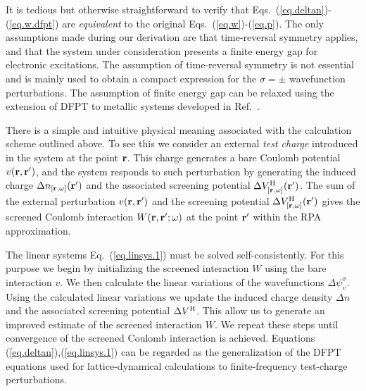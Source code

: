 \documentclass[twocolumn,prb,showpacs,superscriptaddress]{revtex4}
\def\s1{\hspace{0.5cm}}
\def\s2{\hspace{1cm}}
\def\w{\omega}
\def\s{\sigma}
\def\r{{\bf r}}
\def\rp{{\bf r^\prime}}
\begin{document}
It is tedious but otherwise straightforward to verify that 
Eqs.\ (\ref{eq.deltan})-(\ref{eq.w.dfpt}) are {\it equivalent} to the 
original Eqs.\ (\ref{eq.w})-(\ref{eq.p}).
The only assumptions made during our derivation are that 
time-reversal symmetry applies,
and that the system under consideration presents a finite 
energy gap for electronic excitations. 
The assumption of time-reversal symmetry is not essential and is mainly used to
obtain a compact expression for the $\sigma=\pm$ wavefunction perturbations.
The assumption of finite energy gap can be relaxed using the extension
of DFPT to metallic systems developed in Ref.\ . 


There is a simple and intuitive physical meaning associated with 
the calculation scheme outlined above. To see this
we consider an external {\it test charge} introduced in the system
at the point $\r$. This charge generates a bare Coulomb potential $v(\r,\rp)$,
and the system responds to such perturbation by generating the induced charge
$\Delta n_{[\r,\w]}(\rp)$ and the associated 
screening potential $\Delta V^{\rm H}_{[\r,\w]}(\rp)$.
The sum of the external perturbation $v(\r,\rp)$ and the screening
potential $\Delta V^{\rm H}_{[\r,\w]}(\rp)$ gives the screened Coulomb
interaction $W(\r,\rp;\w)$ at the point $\rp$ within the RPA approximation.

The linear systems Eq.\ (\ref{eq.linsys.1}) must be solved self-consistently.
For this purpose we begin by initializing the screened
interaction $W$ using the bare interaction $v$. 
We then calculate the linear variations of the wavefunctions $\Delta \psi_v^\sigma$.
Using the calculated linear variations we update the induced charge density $\Delta n$
and the associated screening potential $\Delta V^{\rm H}$. This allow us to
generate an improved estimate of the screened interaction $W$.
We repeat these steps until convergence of the screened Coulomb
interaction is achieved.
Equations (\ref{eq.deltan}),(\ref{eq.linsys.1}) can be regarded as
the generalization of the DFPT equations used for lattice-dynamical 
calculations\cite{baroni.rmp} to finite-frequency test-charge perturbations.
\end{document}
